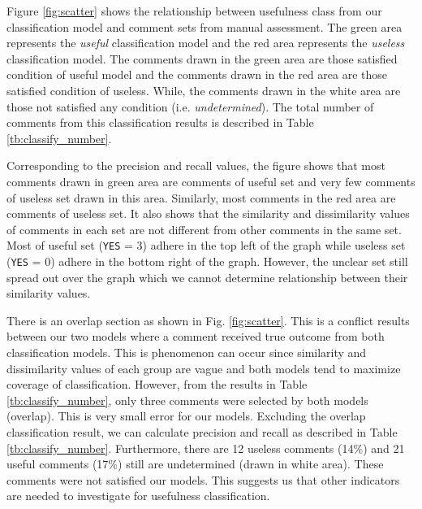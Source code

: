 Figure \ref{fig:scatter} shows the relationship between usefulness class from our classification model and comment sets from manual assessment. 
The green area represents the \emph{useful} classification model and the red area represents the \emph{useless} classification model. The comments drawn in the green area are those satisfied condition of useful model and the comments drawn in the red area are those satisfied condition of useless. While, the comments drawn in the white area are those not satisfied any condition (i.e. \emph{undetermined}). 
The total number of comments from this classification results is described in Table \ref{tb:classify_number}. 



Corresponding to the precision and recall values, the figure shows that most comments drawn in green area are comments of useful set and very few comments of useless set drawn in this area. Similarly, most comments in the red area are comments of useless set. It also shows that the similarity and dissimilarity values of comments in each set are not different from other comments in the same set. Most of useful set (\texttt{YES} = 3) adhere in the top left of the graph while useless set (\texttt{YES} = 0) adhere in the bottom right of the graph. However, the unclear set still spread out over the graph which we cannot determine relationship between their similarity values.

There is an overlap section as shown in Fig. \ref{fig:scatter}. This is a conflict results between our two models where a comment received true outcome from both classification models.  
This is phenomenon can occur since similarity and dissimilarity values of each group are vague and both  models tend to maximize coverage of classification. However, from the results in Table \ref{tb:classify_number}, only three comments were selected by both models (overlap). This is very small error for our models. Excluding the overlap classification result, we can calculate precision and recall as described in Table \ref{tb:classify_number}. Furthermore, there are 12 useless comments (14\%) and 21 useful comments (17\%) still are undetermined (drawn in white area). These comments were not satisfied our models. This suggests us that other indicators are needed to investigate for usefulness classification.


